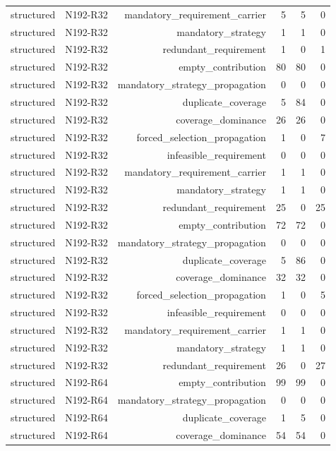 {\begin{longtable}{lrrrrr}
structured & N192-R32 & mandatory\_requirement\_carrier & 5 & 5 & 0 \\
structured & N192-R32 & mandatory\_strategy & 1 & 1 & 0 \\
structured & N192-R32 & redundant\_requirement & 1 & 0 & 1 \\
structured & N192-R32 & empty\_contribution & 80 & 80 & 0 \\
structured & N192-R32 & mandatory\_strategy\_propagation & 0 & 0 & 0 \\
structured & N192-R32 & duplicate\_coverage & 5 & 84 & 0 \\
structured & N192-R32 & coverage\_dominance & 26 & 26 & 0 \\
structured & N192-R32 & forced\_selection\_propagation & 1 & 0 & 7 \\
structured & N192-R32 & infeasible\_requirement & 0 & 0 & 0 \\
structured & N192-R32 & mandatory\_requirement\_carrier & 1 & 1 & 0 \\
structured & N192-R32 & mandatory\_strategy & 1 & 1 & 0 \\
structured & N192-R32 & redundant\_requirement & 25 & 0 & 25 \\
structured & N192-R32 & empty\_contribution & 72 & 72 & 0 \\
structured & N192-R32 & mandatory\_strategy\_propagation & 0 & 0 & 0 \\
structured & N192-R32 & duplicate\_coverage & 5 & 86 & 0 \\
structured & N192-R32 & coverage\_dominance & 32 & 32 & 0 \\
structured & N192-R32 & forced\_selection\_propagation & 1 & 0 & 5 \\
structured & N192-R32 & infeasible\_requirement & 0 & 0 & 0 \\
structured & N192-R32 & mandatory\_requirement\_carrier & 1 & 1 & 0 \\
structured & N192-R32 & mandatory\_strategy & 1 & 1 & 0 \\
structured & N192-R32 & redundant\_requirement & 26 & 0 & 27 \\
structured & N192-R64 & empty\_contribution & 99 & 99 & 0 \\
structured & N192-R64 & mandatory\_strategy\_propagation & 0 & 0 & 0 \\
structured & N192-R64 & duplicate\_coverage & 1 & 5 & 0 \\
structured & N192-R64 & coverage\_dominance & 54 & 54 & 0 \\

\end{longtable}}

